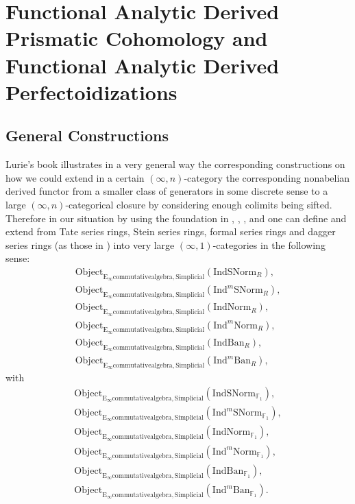 \documentclass[11pt]{book}
\theoremstyle{definition}
\numberwithin{equation}{section}
\begin{document}
\newpage

\section{Functional Analytic Derived Prismatic Cohomology and Functional Analytic Derived Perfectoidizations}

\subsection{General Constructions}

\indent Lurie's book \cite[Section 5.5.8]{Lu3} illustrates in a very general way the corresponding constructions on how we could extend in a certain $(\infty,n)$-category the corresponding nonabelian derived functor from a smaller class of generators in some discrete sense to a large $(\infty,n)$-categorical closure by considering enough colimits being sifted. Therefore in our situation by using the foundation in \cite{12BBBK}, \cite{12BBK}, \cite{BBM}, \cite{12BK} and \cite{KKM} one can define and extend from Tate series rings, Stein series rings, formal series rings and dagger series rings (as those in \cite[Section 4.2]{BBM}) into very large $(\infty,1)$-categories in the following sense:
\begin{align}
\mathrm{Object}_{\mathrm{E}_\infty\mathrm{commutativealgebra},\mathrm{Simplicial}}(\mathrm{IndSNorm}_R),\\
\mathrm{Object}_{\mathrm{E}_\infty\mathrm{commutativealgebra},\mathrm{Simplicial}}(\mathrm{Ind}^m\mathrm{SNorm}_R),\\
\mathrm{Object}_{\mathrm{E}_\infty\mathrm{commutativealgebra},\mathrm{Simplicial}}(\mathrm{IndNorm}_R),\\
\mathrm{Object}_{\mathrm{E}_\infty\mathrm{commutativealgebra},\mathrm{Simplicial}}(\mathrm{Ind}^m\mathrm{Norm}_R),\\
\mathrm{Object}_{\mathrm{E}_\infty\mathrm{commutativealgebra},\mathrm{Simplicial}}(\mathrm{IndBan}_R),\\
\mathrm{Object}_{\mathrm{E}_\infty\mathrm{commutativealgebra},\mathrm{Simplicial}}(\mathrm{Ind}^m\mathrm{Ban}_R),
\end{align}
with
\begin{align}
\mathrm{Object}_{\mathrm{E}_\infty\mathrm{commutativealgebra},\mathrm{Simplicial}}(\mathrm{IndSNorm}_{\mathbb{F}_1}),\\
\mathrm{Object}_{\mathrm{E}_\infty\mathrm{commutativealgebra},\mathrm{Simplicial}}(\mathrm{Ind}^m\mathrm{SNorm}_{\mathbb{F}_1}),\\
\mathrm{Object}_{\mathrm{E}_\infty\mathrm{commutativealgebra},\mathrm{Simplicial}}(\mathrm{IndNorm}_{\mathbb{F}_1}),\\
\mathrm{Object}_{\mathrm{E}_\infty\mathrm{commutativealgebra},\mathrm{Simplicial}}(\mathrm{Ind}^m\mathrm{Norm}_{\mathbb{F}_1}),\\
\mathrm{Object}_{\mathrm{E}_\infty\mathrm{commutativealgebra},\mathrm{Simplicial}}(\mathrm{IndBan}_{\mathbb{F}_1}),\\
\mathrm{Object}_{\mathrm{E}_\infty\mathrm{commutativealgebra},\mathrm{Simplicial}}(\mathrm{Ind}^m\mathrm{Ban}_{\mathbb{F}_1}).
\end{align}
\end{document}
